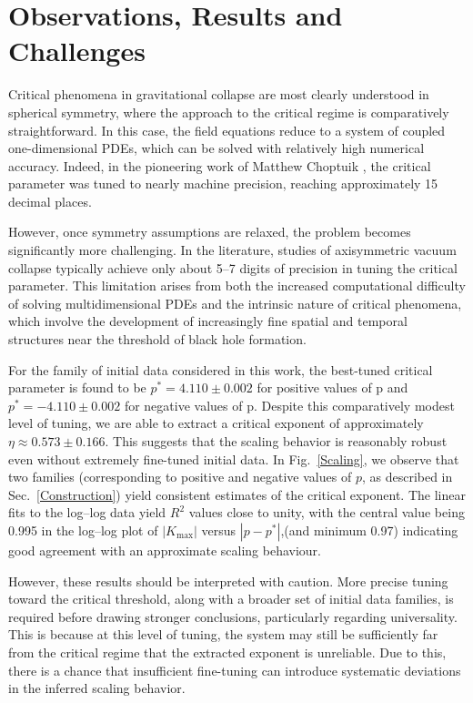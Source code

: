\chapter{Observations, Results and Challenges}

Critical phenomena in gravitational collapse are most clearly understood in spherical symmetry, where the approach to the critical regime is comparatively straightforward. In this case, the field equations reduce to a system of coupled one-dimensional PDEs, which can be solved with relatively high numerical accuracy. Indeed, in the pioneering work of Matthew Choptuik \cite{choptuik_1993}, the critical parameter was tuned to nearly machine precision, reaching approximately 15 decimal places.

However, once symmetry assumptions are relaxed, the problem becomes significantly more challenging. In the literature, studies of axisymmetric vacuum collapse typically achieve only about 5–7 digits of precision in tuning the critical parameter. This limitation arises from both the increased computational difficulty of solving multidimensional PDEs and the intrinsic nature of critical phenomena, which involve the development of increasingly fine spatial and temporal structures near the threshold of black hole formation.

For the family of initial data considered in this work, the best-tuned critical parameter is found to be 
$p^* = 4.110 \pm 0.002$ for positive values of p and $p^* = -4.110 \pm 0.002$ for negative values of p. Despite this comparatively modest level of tuning, we are able to extract a critical exponent of approximately $\eta \approx 0.573 \pm 0.166$. This suggests that the scaling behavior is reasonably robust even without extremely fine-tuned initial data. In Fig.~\ref{Scaling}, we observe that two families (corresponding to positive and negative values of $p$, as described in Sec.~\ref{Construction}) yield consistent estimates of the critical exponent. The linear fits to the log--log data yield $R^2$ values close to unity, with the central value being 0.995 in the log--log plot of $|K_{\max}|$ versus $|p - p^*|$,(and minimum 0.97) indicating good agreement with an approximate scaling behaviour.

However, these results should be interpreted with caution. More precise tuning toward the critical threshold, along with a broader set of initial data families, is required before drawing stronger conclusions, particularly regarding universality. This is because at this level of tuning, the system may still be sufficiently far from the critical regime that the extracted exponent is unreliable. Due to this, there is a chance that insufficient fine-tuning can introduce systematic deviations in the inferred scaling behavior.

